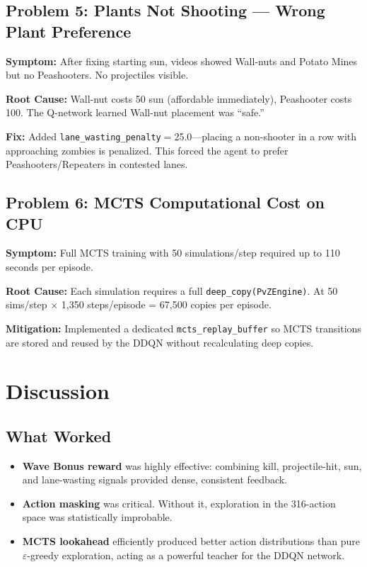 \subsection{Problem 5: Plants Not Shooting --- Wrong Plant Preference}
\textbf{Symptom:} After fixing starting sun, videos showed Wall-nuts and Potato Mines but no Peashooters. No projectiles visible.

\textbf{Root Cause:} Wall-nut costs 50 sun (affordable immediately), Peashooter costs 100. The Q-network learned Wall-nut placement was ``safe.''

\textbf{Fix:} Added \texttt{lane\_wasting\_penalty}$=$25.0---placing a non-shooter in a row with approaching zombies is penalized. This forced the agent to prefer Peashooters/Repeaters in contested lanes.

\subsection{Problem 6: MCTS Computational Cost on CPU}
\textbf{Symptom:} Full MCTS training with 50 simulations/step required up to 110 seconds per episode.

\textbf{Root Cause:} Each simulation requires a full \texttt{deep\_copy(PvZEngine)}. At 50 sims/step $\times$ 1,350 steps/episode = 67,500 copies per episode.

\textbf{Mitigation:} Implemented a dedicated \texttt{mcts\_replay\_buffer} so MCTS transitions are stored and reused by the DDQN without recalculating deep copies.

\section{Discussion}

\subsection{What Worked}
\begin{itemize}[leftmargin=*,nosep]
    \item \textbf{Wave Bonus reward} was highly effective: combining kill, projectile-hit, sun, and lane-wasting signals provided dense, consistent feedback.
    \item \textbf{Action masking} was critical. Without it, exploration in the 316-action space was statistically improbable.
    \item \textbf{MCTS lookahead} efficiently produced better action distributions than pure $\varepsilon$-greedy exploration, acting as a powerful teacher for the DDQN network.
\end{itemize}

